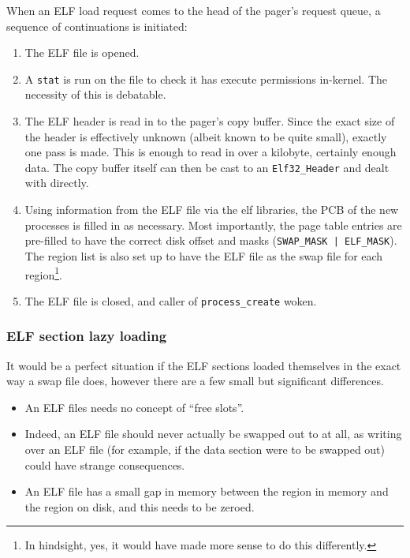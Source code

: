 \documentclass[12pt,english]{article}
\begin{document}
When an ELF load request comes to the head of the pager's request queue, a sequence of continuations is initiated:
\begin{enumerate}
\item The ELF file is opened.
\item A \texttt{stat} is run on the file to check it has execute permissions in-kernel.  The necessity of this is debatable.
\item The ELF header is read in to the pager's copy buffer.  Since the exact size of the header is effectively unknown (albeit known to be quite small), exactly one pass is made.  This is enough to read in over a kilobyte, certainly enough data.  The copy buffer itself can then be cast to an \texttt{Elf32\_Header} and dealt with directly.
\item Using information from the ELF file via the elf libraries, the PCB of the new processes is filled in as necessary.  Most importantly, the page table entries are pre-filled to have the correct disk offset and masks (\texttt{SWAP\_MASK | ELF\_MASK}).  The region list is also set up to have the ELF file as the swap file for each region\footnote{In hindsight, yes, it would have made more sense to do this differently.}.
\item The ELF file is closed, and caller of \texttt{process\_create} woken.
\end{enumerate}

\subsubsection{ELF section lazy loading}

It would be a perfect situation if the ELF sections loaded themselves in the exact way a swap file does, however there are a few small but significant differences.
\begin{itemize}
\item An ELF files needs no concept of ``free slots''.
\item Indeed, an ELF file should never actually be swapped out to at all, as writing over an ELF file (for example, if the data section were to be swapped out) could have strange consequences.
\item An ELF file has a small gap in memory between the region in memory and the region on disk, and this needs to be zeroed.
\end{itemize}
\end{document}
